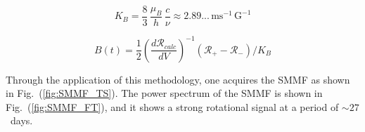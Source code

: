 \begin{equation}
K_B = \frac{8}{3} \, \frac{\mu_B}{h} \, \frac{c}{\nu} \approx 2.89... \, \mathrm{ms}^{-1} \, \mathrm{G}^{-1}
\label{eq:K_B}
\end{equation}

\begin{equation}
B(t) = \frac{1}{2} \left( \frac{d\mathcal{R}_{calc}}{dV} \right)^{-1} (\mathcal{R}_{+} - \mathcal{R}_{-}) / K_B
\label{eq:simplified_SMMF_cal}
\end{equation}

Through the application of this methodology, one acquires the SMMF as shown in Fig.~(\ref{fig:SMMF_TS}). The power spectrum of the SMMF is shown in Fig.~(\ref{fig:SMMF_FT}), and it shows a strong rotational signal at a period of $\sim27$~days. 


